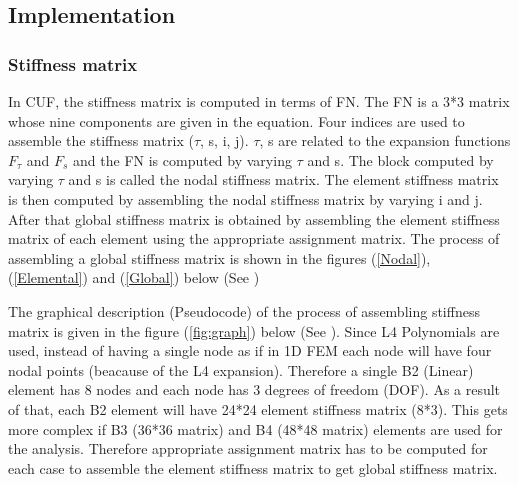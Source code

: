 \documentclass[a4paper,12pt]{article}
\begin{document}
\subsection*{Implementation}
\subsubsection*{Stiffness matrix}
\indent\indent In CUF, the stiffness matrix is computed in terms of FN. The FN is a 3*3 matrix whose nine components are given in the equation. Four indices are used to assemble the stiffness matrix ($\tau$, s, i, j). $\tau$, s are related to the expansion functions $F_{\tau}$ and $F_{s}$ and the FN is computed by varying $\tau$ and s. The block computed by varying $\tau$ and s is called the nodal stiffness matrix. The element stiffness matrix is then computed by assembling the nodal stiffness matrix by varying i and j. After that global stiffness matrix is obtained by assembling the element stiffness matrix of each element using the appropriate assignment matrix. The process of assembling a global stiffness matrix is shown in the figures   (\ref{Nodal}), (\ref{Elemental}) and (\ref{Global})  below (See \cite{carrera2014finite}) 

\indent\indent The graphical description (Pseudocode) of the process of assembling stiffness matrix is given in the figure (\ref{fig:graph}) below (See \cite{carrera2014finite}). Since L4 Polynomials are used, instead of having a single node as if in 1D FEM each node will have four nodal points (beacause of the L4 expansion). Therefore a single B2 (Linear) element has 8 nodes and each node has 3 degrees of freedom (DOF). As a result of that, each B2 element will have 24*24 element stiffness matrix (8*3). This gets more complex if B3 (36*36 matrix) and B4 (48*48 matrix) elements are used for the analysis. Therefore appropriate assignment matrix has to be computed for each case to assemble the element stiffness matrix to get global stiffness matrix.
\end{document}
